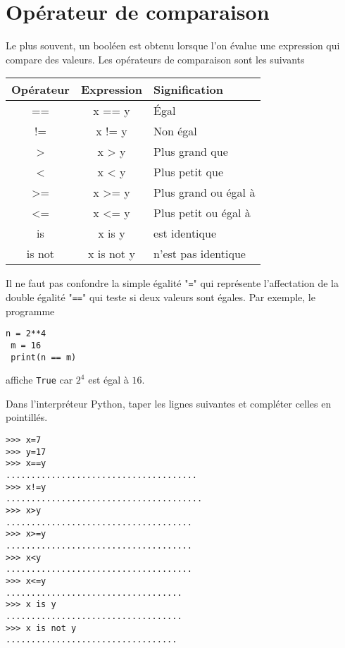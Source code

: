 \section{Opérateur de comparaison}
Le plus souvent, un booléen est obtenu lorsque l'on évalue une expression qui compare des valeurs.  Les opérateurs de comparaison sont les suivants
		\begin{center}
	\begin{tabular}{|c|c|l|}
		\hline
		\rowcolor[HTML]{EFEFEF} 
		Opérateur & Expression  & Signification  \\ \hline
		==&      x == y&          Égal   \\ \hline
		!=&     x  != y&          Non égal   \\ \hline
		>&       x > y &         Plus grand que   \\ \hline
		<&      x < y &          Plus petit que   \\ \hline
		>=&      x >= y&         Plus grand ou égal à   \\ \hline
		<=&      x <= y&         Plus petit ou égal à  \\ \hline
		is&       x is y&        est identique  \\ \hline
	  is not&     x is not y&    n’est pas identique   \\ \hline
		
	\end{tabular}
\end{center}
\begin{important}
	Il ne faut pas confondre la simple égalité "\lstinline{=}" qui représente l'affectation de la double égalité "\lstinline{==}" qui teste si deux valeurs sont égales. Par exemple, le programme
	\begin{lstlisting}[numbers=none]
 n = 2**4
 m = 16
 print(n == m)
	\end{lstlisting}
    affiche \lstinline{True} car $2^4$ est égal à $16$.
\end{important}

\exo Dans l'interpréteur Python, taper les lignes suivantes et compléter celles en pointillés.
\begin{lstlisting}[numbers=none]
>>> x=7 
>>> y=17 
>>> x==y
......................................
>>> x!=y
....................................... 
>>> x>y 
..................................... 
>>> x>=y 
..................................... 
>>> x<y 
..................................... 
>>> x<=y 
................................... 
>>> x is y 
................................... 
>>> x is not y 
..................................
\end{lstlisting}

